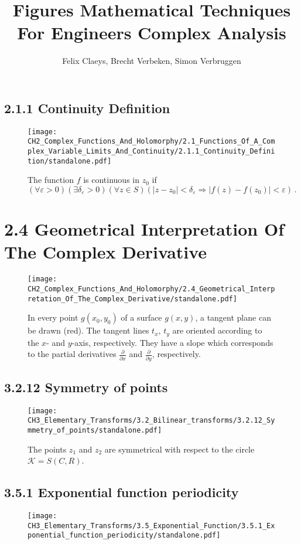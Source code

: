 \documentclass{book}
\title{Figures Mathematical Techniques For Engineers Complex Analysis}
\author{Felix Claeys, Brecht Verbeken, Simon Verbruggen}
\begin{document}
\maketitle
\subsection*{2.1.1 Continuity Definition}
\begin{figure}[H]
\centering
\texttt{[image: CH2\_Complex\_Functions\_And\_Holomorphy/2.1\_Functions\_Of\_A\_Complex\_Variable\_Limits\_And\_Continuity/2.1.1\_Continuity\_Definition/standalone.pdf]}
\caption{The function $f$ is continuous in $z_0$ if $( \forall \varepsilon > 0)(\exists \delta_\varepsilon > 0)(\forall z \in S)(\lvert z-z_0\rvert<\delta_\varepsilon \Longrightarrow \lvert f(z) - f(z_0) \rvert<\varepsilon)\, . $}
\end{figure}

\section*{2.4 Geometrical Interpretation Of The Complex Derivative}
\begin{figure}[H]
\centering
\texttt{[image: CH2\_Complex\_Functions\_And\_Holomorphy/2.4\_Geometrical\_Interpretation\_Of\_The\_Complex\_Derivative/standalone.pdf]}
\caption{In every point  $g(x_0, y_0)$ of a surface $g(x,y)$, a tangent plane can be drawn (red). The tangent lines $t_x$, $t_y$ are oriented according to the $x$- and $y$-axis, respectively. They have a slope which corresponds to the partial derivatives $\frac{\partial}{\partial x}$ and $\frac{\partial}{\partial y}$, respectively.}
\end{figure}

\subsection*{3.2.12 Symmetry of points}
\begin{figure}[H]
\centering
\texttt{[image: CH3\_Elementary\_Transforms/3.2\_Bilinear\_transforms/3.2.12\_Symmetry\_of\_points/standalone.pdf]}
\caption{The points $z_1$ and $z_2$ are symmetrical with respect to the circle $\mathcal{K} = S(C,R)$.}
\end{figure}

\subsection*{3.5.1 Exponential function periodicity}
\begin{figure}[H]
\centering
\texttt{[image: CH3\_Elementary\_Transforms/3.5\_Exponential\_Function/3.5.1\_Exponential\_function\_periodicity/standalone.pdf]}
\caption{}
\end{figure}
\end{document}
